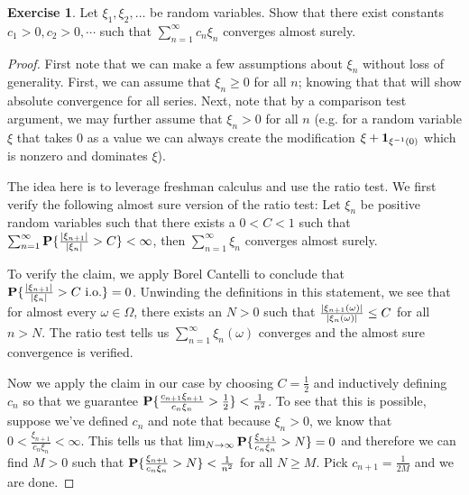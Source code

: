 \documentclass{amsart}
\theoremstyle{remark}
\theoremstyle{definition}
\newtheorem{ex}[thm]{Exercise}
\begin{document}
\begin{ex}Let $\xi_1, \xi_2, \dots$ be random variables.  Show that
  there exist constants $c_1 > 0, c_2 >0, \cdots$ such that
  $\sum_{n=1}^\infty c_n \xi_n$ converges almost surely.
\end{ex}
\begin{proof}First note that we can make a few assumptions about $\xi_n$ without
loss of generality.  First, we can assume that $\xi_n \geq 0$ for all
$n$; knowing that that will show absolute convergence for all series.  Next,
note that by a comparison test argument, we may further assume that $\xi_n >
0$ for all $n$ (e.g. for a random variable $\xi$ that takes $0$ as a value we can
always create the modification $\xi + \textbf{1}_{\xi^{-1}(0)}$
which is nonzero and dominates $\xi$).  

The idea here is to leverage freshman calculus and use the ratio
test.  We first verify the following almost sure version of the ratio
test: Let $\xi_n$ be positive random variables such that there exists
a $0 < C < 1$ such that
$\sum_{n=1}^\infty \textbf{P}\{\frac{\left \vert \xi_{n+1} \right \vert}{\left \vert \xi_n \right \vert} >
  C\} < \infty$, then $\sum_{n=1}^\infty \xi_n$ converges almost
surely.

To verify the claim, we apply Borel Cantelli to conclude that $\textbf{P}\{\frac{\left \vert \xi_{n+1} \right \vert}{\left \vert \xi_n \right \vert} >
  C \text{ i.o.}\} = 0$.  Unwinding the definitions in this statement, we see that for
almost every $\omega \in \Omega$, there exists an $N>0$ such that
$\frac{\left \vert \xi_{n+1}(\omega) \right \vert}{\left \vert \xi_n(\omega) \right \vert} \leq C$
for all $n > N$.  The ratio test tells us $\sum_{n=1}^\infty
\xi_n(\omega)$  converges and the almost sure convergence is verified.

Now we apply the claim in our case by choosing $C=\frac{1}{2}$ and inductively defining $c_n$ so
that we guarantee $\textbf{P}\{\frac{c_{n+1} \xi_{n+1}}{c_n \xi_n} >
  \frac{1}{2}\} < \frac{1}{n^2}$.  To see that this is possible,
suppose we've defined $c_n$ and note that because $\xi_n > 0$, we know
that $0 < \frac{\xi_{n+1}}{c_n \xi_n} < \infty$.  This tells us that
$\lim_{N \to \infty} \textbf{P}\{\frac{\xi_{n+1}}{c_n \xi_n} > N\} =0$
and therefore we can find $M>0$ such that
$\textbf{P}\{\frac{\xi_{n+1}}{c_n \xi_n} > N\} < \frac{1}{n^2}$ for
all $N\geq M$.  Pick $c_{n+1} = \frac{1}{2M}$ and we are done.


\end{proof}
\end{document}
